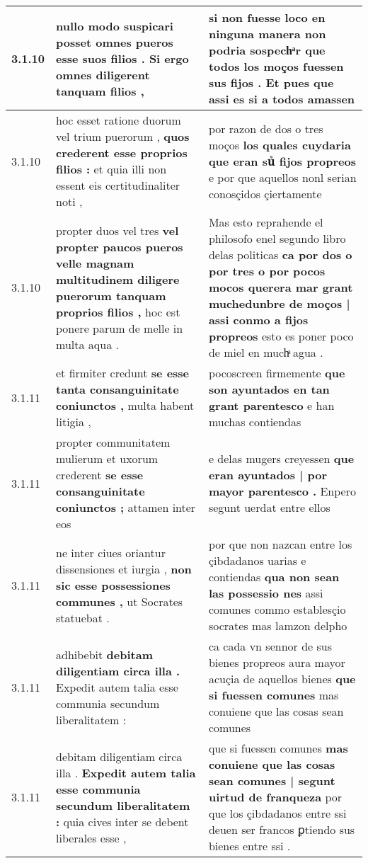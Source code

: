 \begin{tabular}{|p{1cm}|p{6.5cm}|p{6.5cm}|}
3.1.10 & nullo modo suspicari posset \textbf{ omnes pueros esse suos filios . } Si ergo omnes diligerent tanquam filios , & si non fuesse loco en ninguna manera non podria sospechͣr \textbf{ que todos los moços fuessen sus fijos . } Et pues que assi es si a todos amassen \\\hline
3.1.10 & hoc esset ratione duorum vel trium puerorum , \textbf{ quos crederent esse proprios filios : } et quia illi non essent eis certitudinaliter noti , & por razon de dos o tres moços \textbf{ los quales cuydaria que eran suᷤ fijos propreos } e por que aquellos nonl serian conosçidos çiertamente \\\hline
3.1.10 & propter duos vel tres \textbf{ vel propter paucos pueros velle magnam multitudinem diligere puerorum tanquam proprios filios , } hoc est ponere parum de melle in multa aqua . & Mas esto reprahende el philosofo enel segundo libro delas politicas \textbf{ ca por dos o por tres o por pocos mocos querera mar grant muchedunbre de moços | assi conmo a fijos propreos } esto es poner poco de miel en muchͣ agua . \\\hline
3.1.11 & et firmiter credunt \textbf{ se esse tanta consanguinitate coniunctos , } multa habent litigia , & pocoscreen firmemente \textbf{ que son ayuntados en tan grant parentesco } e han muchas contiendas \\\hline
3.1.11 & propter communitatem mulierum et uxorum crederent \textbf{ se esse consanguinitate coniunctos ; } attamen inter eos & e delas mugers creyessen \textbf{ que eran ayuntados | por mayor parentesco . } Enpero segunt uerdat entre ellos \\\hline
3.1.11 & ne inter ciues oriantur dissensiones et iurgia , \textbf{ non sic esse possessiones communes , } ut Socrates statuebat . & por que non nazcan entre los çibdadanos uarias e contiendas \textbf{ qua non sean las possessio nes } assi comunes commo establesçio socrates mas lamzon delpho \\\hline
3.1.11 & adhibebit \textbf{ debitam diligentiam circa illa . } Expedit autem talia esse communia secundum liberalitatem : & ca cada vn sennor de sus bienes propreos aura mayor acuçia de aquellos bienes \textbf{ que si fuessen comunes } mas conuiene que las cosas sean comunes \\\hline
3.1.11 & debitam diligentiam circa illa . \textbf{ Expedit autem talia esse communia secundum liberalitatem : } quia cives inter se debent liberales esse , & que si fuessen comunes \textbf{ mas conuiene que las cosas sean comunes | segunt uirtud de franqueza } por que los çibdadanos entre ssi deuen ser francos ꝑtiendo sus bienes entre ssi . \\\hline

\end{tabular}

